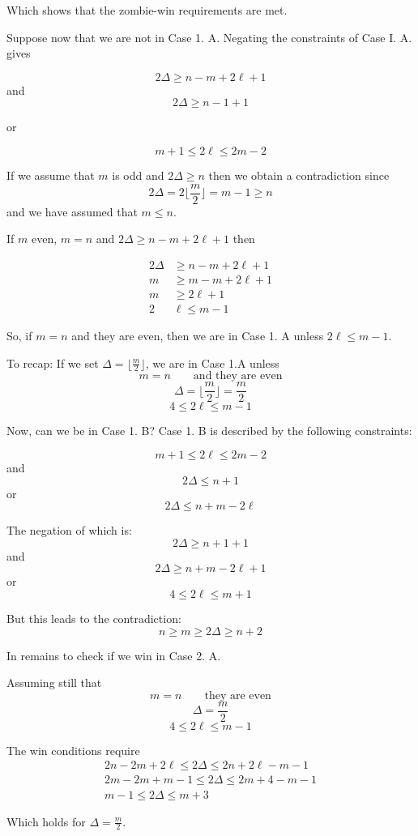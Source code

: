 Which shows that the zombie-win requirements are met.

Suppose now that we are not in Case 1. A. Negating the constraints of Case I. A. gives

\[ 2\Delta \geq n - m + 2\ell +1 \]
and
\[ 2 \Delta \geq n - 1 + 1 \]

or

\[ m+1 \leq 2 \ell \leq 2m -2 \]

If we assume that $m$ is odd and $ 2 \Delta \geq n$ then we obtain a
contradiction since
\[ 2 \Delta = 2 \lfloor \frac{m}{2} \rfloor = m -1 \geq n \]
and we have assumed that $m \leq n$.

If $m$ even, $m = n$ and $2\Delta \geq n - m + 2\ell +1$ then

\begin{align*}
  2 \Delta & \geq n - m + 2\ell + 1 \\
  m & \geq m - m + 2 \ell + 1 \\
  m & \geq 2 \ell + 1 \\
  2 & \ell \leq m -1
\end{align*}

So, if $m = n$ and they are even, then we are in Case 1. A unless $2 \ell \leq m -1$.

To recap: If we set $\Delta = \lfloor \frac{m}{2} \rfloor$, we are in Case 1.A unless
\[ m = n \qquad \text{and they are even} \]
\[ \Delta = \lfloor \frac{m}{2} \rfloor = \frac{m}{2} \]
\[ 4 \leq 2 \ell \leq m -1 \]

Now, can we be in Case 1. B? Case 1. B is described by the following constraints:

\[ m+1 \leq 2 \ell \leq 2m -2 \]
and
\[2 \Delta \leq n +1 \]
or
\[2\Delta \leq n + m - 2 \ell \]

The negation of which is:
\[2 \Delta \geq n +1 +1 \]
and
\[2\Delta \geq n + m - 2 \ell + 1\]
or
\[4 \leq 2 \ell \leq m +1 \]

But this leads to the contradiction:
\[ n \geq m \geq 2 \Delta \geq n +2 \]

In remains to check if we win in Case 2. A.

Assuming still that
\[ m = n \qquad \text{they are even} \]
\[ \Delta = \frac{m}{2} \]
\[ 4 \leq 2 \ell \leq m -1 \]

The win conditions require
\begin{align*}
2n - 2m + 2\ell \leq 2 \Delta \leq 2n + 2\ell -m -1 \\
2m - 2m + m - 1 \leq 2 \Delta \leq 2m + 4 - m - 1 \\
m - 1 \leq 2 \Delta \leq m + 3
\end{align*}

Which holds for $\Delta = \frac{m}{2}$.
